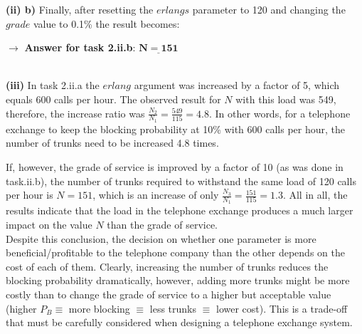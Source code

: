 \newpage
\large\textbf{(ii) b)} \normalsize Finally, after resetting the $erlangs$ parameter to 120 and changing the\\
$grade$ value to 0.1\% the result becomes:

\centerline{$\rightarrow$\textbf{ Answer for task 2.ii.b}: \large$\underline{\mathbf{N=151}}$}\normalsize ~\\

\large\textbf{(iii)} \normalsize
In task 2.ii.a the $erlang$ argument was increased by a factor of 5, which equals 600 calls per hour. The observed result for $N$  with this load was 549, therefore, the increase ratio was $\frac{N_2}{N_1} = \frac{549}{115} = \mathbf{4.8}$. In other words, for a telephone exchange to keep the blocking probability at 10\% with 600 calls per hour, the number of trunks need to be increased 4.8 times.

If, however, the grade of service is improved by a factor of 10 (as was done in task.ii.b), the number of trunks required to withstand the same load of 120 calls per hour is $N=151$, which is an increase of only $\frac{N_3}{N_1} = \frac{151}{115} = \mathbf{1.3}$. All in all, the results indicate that the load in the telephone exchange produces a much larger impact on the value $N$ than the grade of service.\\

Despite this conclusion, the decision on whether one parameter is more beneficial/profitable to the telephone company than the other depends on the cost of each of them. Clearly, increasing the number of trunks reduces the blocking probability dramatically, however, adding more trunks might be more costly than to change the grade of service to a higher but acceptable value (higher $P_B\equiv$  more blocking $\equiv$ less trunks $\equiv$ lower cost). This is a trade-off that must be carefully considered when designing a telephone exchange system.
\newpage